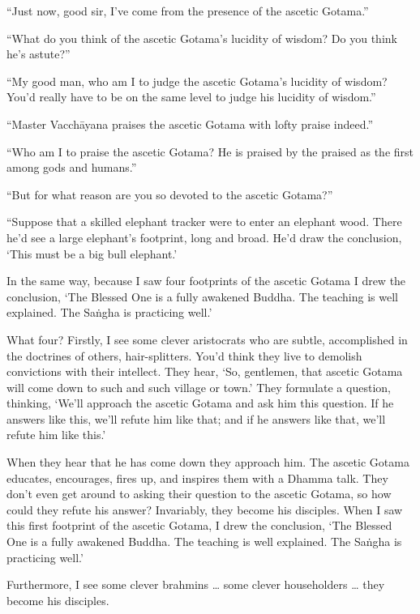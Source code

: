 \documentclass[12pt,openany]{book}%
\begin{document}
“Just now, good sir, I’ve come from the presence of the ascetic Gotama.” 

“What do you think of the ascetic Gotama’s lucidity of wisdom? Do you think he’s astute?” 

“My good man, who am I to judge the ascetic Gotama’s lucidity of wisdom? You’d really have to be on the same level to judge his lucidity of wisdom.” 

“Master \textsanskrit{Vacchāyana} praises the ascetic Gotama with lofty praise indeed.” 

“Who am I to praise the ascetic Gotama? He is praised by the praised as the first among gods and humans.” 

“But for what reason are you so devoted to the ascetic Gotama?” 

“Suppose that a skilled elephant tracker were to enter an elephant wood. There he’d see a large elephant’s footprint, long and broad. He’d draw the conclusion, ‘This must be a big bull elephant.’ 

In the same way, because I saw four footprints of the ascetic Gotama I drew the conclusion, ‘The Blessed One is a fully awakened Buddha. The teaching is well explained. The \textsanskrit{Saṅgha} is practicing well.’ 

What four? Firstly, I see some clever aristocrats who are subtle, accomplished in the doctrines of others, hair-splitters. You’d think they live to demolish convictions with their intellect. They hear, ‘So, gentlemen, that ascetic Gotama will come down to such and such village or town.’ They formulate a question, thinking, ‘We’ll approach the ascetic Gotama and ask him this question. If he answers like this, we’ll refute him like that; and if he answers like that, we’ll refute him like this.’ 

When they hear that he has come down they approach him. The ascetic Gotama educates, encourages, fires up, and inspires them with a Dhamma talk. They don’t even get around to asking their question to the ascetic Gotama, so how could they refute his answer? Invariably, they become his disciples. When I saw this first footprint of the ascetic Gotama, I drew the conclusion, ‘The Blessed One is a fully awakened Buddha. The teaching is well explained. The \textsanskrit{Saṅgha} is practicing well.’ 

Furthermore, I see some clever brahmins … some clever householders … they become his disciples. 
\end{document}
